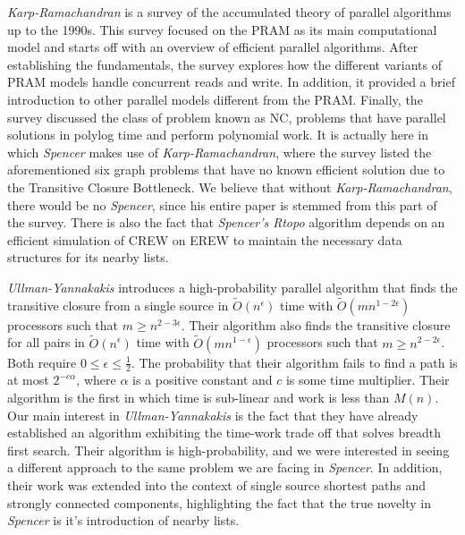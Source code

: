 \documentclass[paper=a4, fontsize=11pt]{scrartcl} %
\numberwithin{equation}{section} %
\numberwithin{figure}{section} %
\numberwithin{table}{section} %
\begin{document}
\textit{Karp-Ramachandran\cite{KR90}} is a survey of the accumulated theory of parallel algorithms up to the 1990s. This survey focused on the PRAM as its main computational model and starts off with an overview of efficient parallel algorithms. After establishing the fundamentals, the survey explores how the different variants of PRAM models handle concurrent reads and write. In addition, it provided a brief introduction to other parallel models different from the PRAM. Finally, the survey discussed the class of problem known as NC, problems that have parallel solutions in polylog time and perform polynomial work.  It is actually here in which \textit{Spencer\cite{S97}} makes use of \textit{Karp-Ramachandran\cite{KR90}}, where the survey listed the aforementioned six graph problems that have no known efficient solution due to the Transitive Closure Bottleneck. We believe that without \textit{Karp-Ramachandran\cite{KR90}}, there would be no \textit{Spencer\cite{S97}}, since his entire paper is stemmed from this part of the survey. There is also the fact that \textit{Spencer's\cite{S97} Rtopo} algorithm depends on an efficient simulation of CREW on EREW to maintain the necessary data structures for its nearby lists.

\textit{Ullman-Yannakakis\cite{UY91}} introduces a high-probability parallel algorithm that finds the transitive closure from a single source in $\tilde{O}(n^\epsilon)$ time with $\tilde{O}(mn^{1-2\epsilon})$ processors such that $m \geq n^{2-3\epsilon}$. Their algorithm also finds the transitive closure for all pairs in $\tilde{O}(n^\epsilon)$ time with $\tilde{O}(mn^{1-\epsilon})$ processors such that $m \geq n^{2-2\epsilon}$. Both require $0 \leq \epsilon \leq \frac{1}{2}$. The probability that their algorithm fails to find a path is at most $2^{-c\alpha}$, where $\alpha$ is a positive constant and $c$ is some time multiplier. Their algorithm is the first in which time is sub-linear and work is less than $M(n)$. Our main interest in \textit{Ullman-Yannakakis\cite{UY91}} is the fact that they have already established an algorithm exhibiting the time-work trade off that solves breadth first search. Their algorithm is high-probability, and we were interested in seeing a different approach to the same problem we are facing in \textit{Spencer\cite{S97}}. In addition, their work was extended into the context of single source shortest paths and strongly connected components, highlighting the fact that the true novelty in \textit{Spencer\cite{S97}} is it's introduction of nearby lists.
\end{document}
